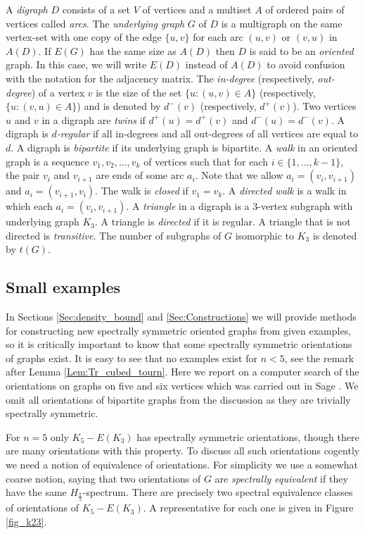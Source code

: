 \documentclass[11pt]{article}
\theoremstyle{plain}
\newcommand{\ssym}[0]{spectrally symmetric }
\newcommand{\Hs}[0]{H_{\frac{\pi}{3}}}
\newcommand{\ssymend}[0]{spectrally symmetric}
\begin{document}
A \emph{digraph} $D$ consists of a set $V$ of vertices and a multiset $A$ of ordered pairs of vertices called \emph{arcs}. The \emph{underlying graph} $G$ of $D$ is a multigraph on the same vertex-set with one copy of the edge $\{u,v\}$ for each arc $(u,v)$ or $(v,u)$ in $A(D)$. If $E(G)$ has the same size as $A(D)$ then $D$ is said to be an \emph{oriented} graph. In this case, we will write $E(D)$ instead of $A(D)$ to avoid confusion with the notation for the adjacency matrix. The \emph{in-degree} (respectively, \emph{out-degree}) of a vertex $v$ is the size of the set $\{u: (u,v)\in A\}$ (respectively, $\{u: (v,u)\in A\}$) and is denoted by $d^-(v)$ (respectively, $d^+(v)$). Two vertices $u$ and $v$ in a digraph are \emph{twins} if $d^+(u)=d^+(v)$ and $d^-(u)=d^-(v)$. A digraph is \emph{$d$-regular} if all in-degrees and all out-degrees of all vertices are equal to $d$. A digraph is \emph{bipartite} if its underlying graph is bipartite. A \emph{walk} in an oriented graph is a sequence $v_1,v_2,\dots, v_k$ of vertices such that for each $i\in \{1,\dots,k-1\}$, the pair $v_i$ and $v_{i+1}$ are ends of some arc $a_i$. Note that we allow $a_i=(v_i,v_{i+1})$ and $a_i=(v_{i+1},v_i)$. The walk is \emph{closed} if $v_1=v_k$. A \emph{directed walk} is a walk in which each $a_i=(v_i,v_{i+1})$.
A \emph{triangle} in a digraph is a 3-vertex subgraph with underlying graph $K_3$. A triangle is \emph{directed} if it is regular. A triangle that is not directed is \emph{transitive}. The number of subgraphs of $G$ isomorphic to $K_3$ is denoted by $t(G)$.



\subsection{Small examples}\label{Sec:smallex}
In Sections \ref{Sec:density_bound} and \ref{Sec:Constructions} we will provide methods for constructing new \ssym oriented graphs from given examples, so it is critically important to know that some \ssym orientations of graphs exist. It is easy to see that no examples exist for $n<5$, see the remark after Lemma \ref{Lem:Tr_cubed_tourn}. Here we report on a computer search of the orientations on graphs on five and six vertices which was carried out in Sage \cite{sagemath}. We omit all orientations of  bipartite graphs from the discussion as they are trivially \ssymend.

For $n=5$ only $K_5-E(K_3)$ has \ssym orientations, though there are many orientations with this property.  To discuss all such orientations cogently we need a notion of equivalence of orientations. For simplicity we use a somewhat coarse notion, saying that two orientations of $G$ are \emph{spectrally equivalent} if they have the same $\Hs$-spectrum. There are precisely two spectral equivalence classes of orientations of $K_5-E(K_3)$. A representative for each one is given in Figure \ref{fig_k23}.
\end{document}
